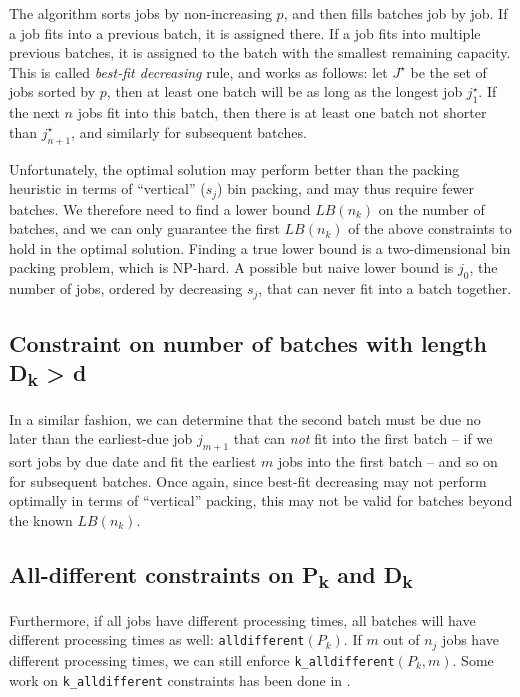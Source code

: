 The algorithm sorts jobs by non-increasing $p$, and then fills batches job by
job. If a job fits into a previous batch, it is assigned there. If a job fits
into multiple previous batches, it is assigned to the batch with the smallest
remaining capacity. This is called \textit{best-fit decreasing} rule,
and works as follows: let $J^\star$ be the set of jobs sorted by $p$, then at
least one batch will be as long as the longest job $j^\star_1$. If the next $n$
jobs fit into this batch, then there is at least one batch not shorter than
$j^\star_{n+1}$, and similarly for subsequent batches. 

Unfortunately, the optimal solution may perform better than the packing heuristic in
terms of ``vertical'' ($s_j$) bin packing, and may thus require fewer batches.
We therefore need to find a lower bound $LB(n_k)$ on the number of batches, and
we can only guarantee the first $LB(n_k)$ of the above constraints to hold in
the optimal solution. Finding a true lower bound is a two-dimensional bin
packing problem, which is NP-hard. A possible but naive lower bound is $j_0$,
the number of jobs, ordered by decreasing $s_j$, that can never fit into a batch
together.

\subsection[Constraint on the number of batches with due date $D_k >
d$]{Constraint on number of batches with length {\sansitalicfont
D\textsubscript{k}} > {\sansitalicfont d}}

In a similar fashion, we can determine that the second batch must be due no
later than the earliest-due job $j_{m+1}$ that can \textit{not} fit into the first
batch -- if we sort jobs by due date and fit the earliest $m$ jobs into the first
batch -- and so on for subsequent batches. Once again, since best-fit decreasing
may not perform optimally in terms of ``vertical'' packing, this may not be
valid for batches beyond the known $LB(n_k)$.

\subsection[All-different constraints on $P_k$ and $D_k$]{All-different
constraints on {\sansitalicfont P\textsubscript{k}} and {\sansitalicfont
D\textsubscript{k}}}

Furthermore, if all jobs have different processing times, all batches will have different
processing times as well: \texttt{alldifferent}$(P_k)$. If $m$ out of $n_j$
jobs have different processing times, we can still enforce
\texttt{k\_alldifferent}$(P_k, m)$. Some work on \texttt{k\_alldifferent}
constraints has been done in \citep{Lardeux}. 

